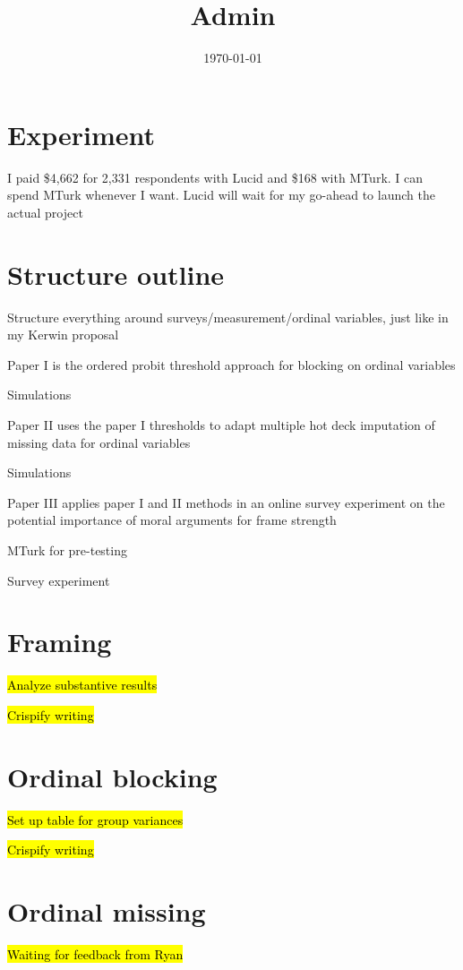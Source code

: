 \documentclass[12pt]{article}
\title{Admin}
\date{\today}
\begin{document}
\maketitle


\section*{Experiment}
	\begin{coi}
		\item I paid \$4,662 for 2,331 respondents with Lucid and \$168 with MTurk. I can spend MTurk whenever I want. Lucid will wait for my go-ahead to launch the actual project
	\end{coi}	
	
\section*{Structure outline}
	\begin{coi}
		\item Structure everything around surveys/measurement/ordinal variables, just like in my Kerwin proposal
		\item Paper I is the ordered probit threshold approach for blocking on ordinal variables
			\begin{coi}
				\item Simulations
			\end{coi}
		\item Paper II uses the paper I thresholds to adapt multiple hot deck imputation of missing data for ordinal variables
			\begin{coi}
				\item Simulations
			\end{coi}
		\item Paper III applies paper I and II methods in an online survey experiment on the potential importance of moral arguments for frame strength
			\begin{coi}
				\item MTurk for pre-testing
				\item Survey experiment
			\end{coi}
	\end{coi}


\section*{Framing}
	\begin{coi}
		\item \hl{Analyze substantive results}
		\item \hl{Crispify writing}
	\end{coi} 

\section*{Ordinal blocking}
	\begin{coi}
		\item \hl{Set up table for group variances}
		\item \hl{Crispify writing}
	\end{coi}
	
\section*{Ordinal missing}
	\begin{coi}
		\item \hl{Waiting for feedback from Ryan}
	\end{coi}
	

	
\end{document}
